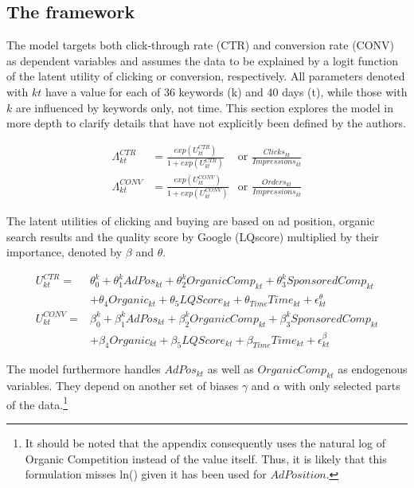 \subsection{The framework}
The model targets both click-through rate (CTR) and conversion rate (CONV) as dependent variables and assumes the data to be explained by a logit function of the latent utility of clicking or conversion, respectively. All parameters denoted with $kt$ have a value for each of 36 keywords (k) and 40 days (t), while those with $k$ are influenced by keywords only, not time. This section explores the model in more depth to clarify details that have not explicitly been defined by the authors.

\begin{equation} \label{eq:lambda}
    \begin{array}{lll}
     \Lambda^{CTR}_{kt} &= \tfrac{exp(U^{CTR}_{kt})}{1+ exp(U^{CTR}_{kt})}   &\text{or } \tfrac{Clicks_{kt}}{Impressions_{kt}}\\[10pt]
     \Lambda^{CONV}_{kt} &= \tfrac{exp(U^{CONV}_{kt})}{1+ exp(U^{CONV}_{kt})}   &\text{or } \tfrac{Orders_{kt}}{Impressions_{kt}}
    \end{array}
\end{equation}

The latent utilities of clicking and buying are based on ad position, organic search results and the quality score by Google (LQscore) multiplied by their importance, denoted by $\beta$ and $\theta$.

\begin{equation} \label{eq:mainlinear}
    \begin{array}{ll}
     U^{CTR}_{kt} =& \theta^{k}_{0} +  \theta^{k}_{1} AdPos_{kt} + \theta^{k}_{2} OrganicComp_{kt} + \theta^{k}_{3} SponsoredComp_{kt}\\
     &+ \theta_{4} Organic_{kt} + \theta_{5} LQScore_{kt} + \theta_{Time} Time_{kt} + \epsilon^{\theta}_{kt}\\[10pt]
     U^{CONV}_{kt} =& \beta^{k}_{0} +  \beta^{k}_{1} AdPos_{kt} + \beta^{k}_{2} OrganicComp_{kt} + \beta^{k}_{3} SponsoredComp_{kt}\\
     &+ \beta_{4} Organic_{kt} + \beta_{5} LQScore_{kt} + \beta_{Time} Time_{kt} + \epsilon^{\beta}_{kt}
    \end{array}
\end{equation}

The model furthermore handles $AdPos_{kt}$ as well as $OrganicComp_{kt}$ as endogenous variables. They depend on another set of biases $\gamma$ and $\alpha$ with only selected parts of the data.\footnote{It should be noted that the appendix consequently uses the natural log of Organic Competition instead of the value itself. Thus, it is likely that this formulation misses ln() given it has been used for $AdPosition$.}


